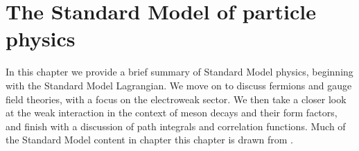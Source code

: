 \chapter{The Standard Model of particle physics}\label{cha:Standard_Model}
In this chapter we provide a brief summary of Standard Model physics, beginning with the Standard Model Lagrangian.  We move on to discuss fermions and gauge field theories, with a focus on the electroweak sector.  We then take a closer look at the weak interaction in the context of meson decays and their form factors, and finish with a discussion of path integrals and correlation functions.  Much of the Standard Model content in chapter this chapter is drawn from \cite{peskin1995qft, weinberg1995qft1, schwartz2014qft}.

